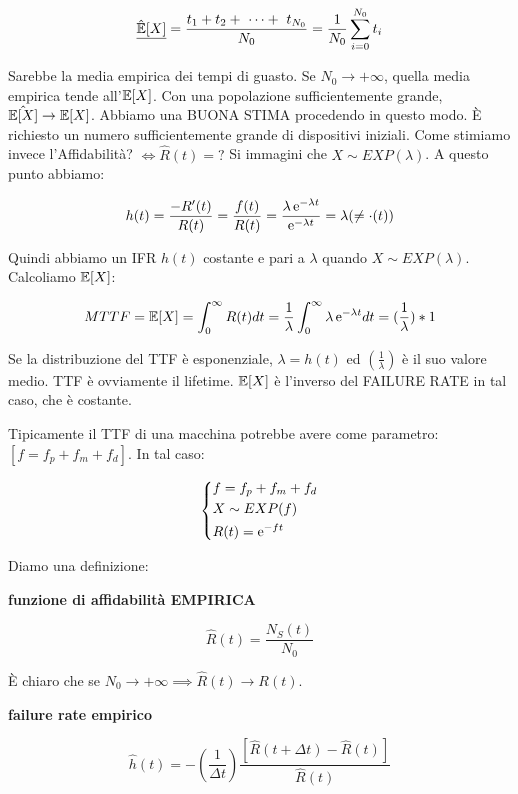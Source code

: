 \[
	\underline{\hat{\operatorname{\mathbb{E}}}[X]} = \frac{t_1+t_2 +\ \dots+\ t_{N_0}}{N_0} = \frac{1}{N_0}\sum_{i=0}^{N_0}{t_i}
\]

Sarebbe la media empirica dei tempi di guasto. Se $N_0\to+\infty$, quella media empirica tende all'$\operatorname{\mathbb{E}}[X]$. Con una popolazione sufficientemente grande, $\hat{\operatorname{\mathbb{E}}[X]} \to \operatorname{\mathbb{E}}[X]$. Abbiamo una BUONA STIMA procedendo in questo modo. \`E richiesto un numero sufficientemente grande di dispositivi iniziali. Come stimiamo invece l'Affidabilità? $\iff \hat{R}(t)=?$ Si immagini che $X \sim EXP(\lambda)$. A questo punto abbiamo:

\[
	h(t) = \frac{-R'(t)}{R(t)} = \frac{f(t)}{R(t)} = \frac{\lambda\mathop{}\!\mathrm{e}^{-\lambda t}}{\mathop{}\!\mathrm{e}^{-\lambda t}} = \lambda (\neq \mathord{\cdot}(t))
\]

Quindi abbiamo un IFR $h(t)$ costante e pari a $\lambda$ quando $X \sim EXP(\lambda)$. Calcoliamo $\operatorname{\mathbb{E}}[X]$:

\[
	MTTF = \operatorname{\mathbb{E}}[X] = \int_0^\infty{R(t)dt} = \frac{1}{\lambda}\int_0^\infty{\lambda\mathop{}\!\mathrm{e}^{-\lambda t}dt} = (\frac{1}{\lambda})*1
\]

Se la distribuzione del TTF è esponenziale, $\lambda=h(t)$ ed $(\frac{1}{\lambda})$ è il suo valore medio. TTF è ovviamente il lifetime. $\operatorname{\mathbb{E}}[X]$ è l'inverso del FAILURE RATE in tal caso, che è costante.

Tipicamente il TTF di una macchina potrebbe avere come parametro: $[f = f_p+f_m+f_d]$. In tal caso:

\[
	\left\{
	\begin{aligned}
	&f = f_p+f_m+f_d\\
	&X \sim EXP(f)\\
	&R(t) = \mathop{}\!\mathrm{e}^{-ft}
	\end{aligned}
	\right.
\]

Diamo una definizione:

\begin{defn}{\textbf{funzione di affidabilità EMPIRICA}}

\[
	\hat{R}(t) = \frac{N_S(t)}{N_0}
\]

\end{defn}

\`E chiaro che se $N_0\to +\infty \implies \hat{R}(t) \to R(t)$.

\begin{defn}{\textbf{failure rate empirico}}

\[
	\hat{h}(t) = -(\frac{1}{\Delta t})\frac{[\hat{R}(t+\Delta t) - \hat{R}(t)]}{\hat{R}(t)}
\]

\end{defn}

